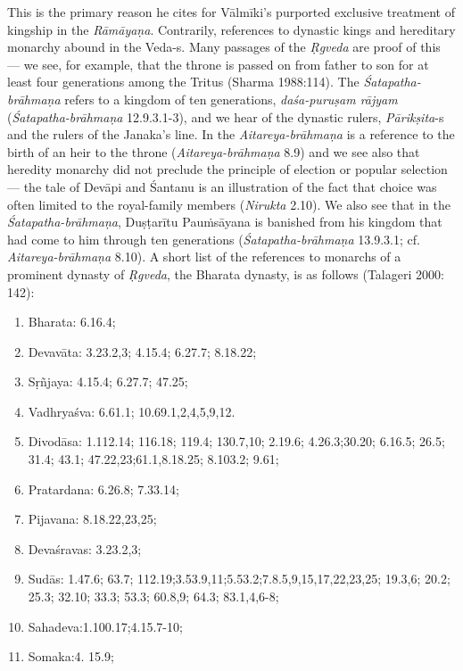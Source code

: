 This is the primary reason he cites for Vālmīki’s purported exclusive treatment of kingship in the {\sl Rāmāyaṇa}. Contrarily, references to dynastic kings and hereditary monarchy abound in the Veda-s. Many passages of the {\sl Ṛgveda} are proof of this --- we see, for example, that the throne is passed on from father to son for at least four generations among the Tritus (Sharma 1988:114). The {\sl Śatapatha-brāhmaṇa} refers to a kingdom of ten generations, {\sl daśa-puruṣam rājyam} ({\sl Śatapatha-brāhmaṇa} 12.9.3.1-3), and we hear of the dynastic rulers, \hbox{{\sl Pārikṣita}-s} and the rulers of the Janaka’s line. In the {\sl Aitareya-brāhmaṇa} is a reference to the birth of an heir to the throne ({\sl Aitareya-brāhmaṇa} 8.9) and we see also that heredity monarchy did not preclude the principle of election or popular selection--- the tale of Devāpi and Śantanu is an illustration of the fact that choice was often limited to the royal-family members ({\sl Nirukta} 2.10). We also see that in the {\sl Śatapatha-brāhmaṇa}, Duṣṭarītu Pauṁsāyana is banished from his kingdom that had come to him through ten generations ({\sl Śatapatha-brāhmaṇa} 13.9.3.1; cf. {\sl Aitareya-brāhmaṇa} 8.10). A short list of the references to monarchs of a prominent dynasty of {\sl Ṛgveda}, the Bharata dynasty, is as follows (Talageri 2000: 142):
\begin{enumerate}
\itemsep=1pt
\item Bharata: 6.16.4;
\item Devavāta: 3.23.2,3; 4.15.4; 6.27.7; 8.18.22;
\item Sṛñjaya: 4.15.4; 6.27.7; 47.25;
\item Vadhryaśva:  6.61.1; 10.69.1,2,4,5,9,12. 
\item Divodāsa: 1.112.14; 116.18; 119.4; 130.7,10; 2.19.6; 4.26.3;30.20; 6.16.5; 26.5; 31.4; 43.1; 47.22,23;61.1,8.18.25; 8.103.2; 9.61;
\item Pratardana:  6.26.8; 7.33.14;
\item Pijavana: 8.18.22,23,25;
\item Devaśravas: 3.23.2,3;
\item Sudās: 1.47.6; 63.7; 112.19;3.53.9,11;5.53.2;7.8.5,9,15,17,22,23,25; 19.3,6; 20.2; 25.3; 32.10; 33.3; 53.3; 60.8,9; 64.3; 83.1,4,6-8; 
\item Sahadeva:1.100.17;4.15.7-10;
\item Somaka:4. 15.9;
\end{enumerate}

